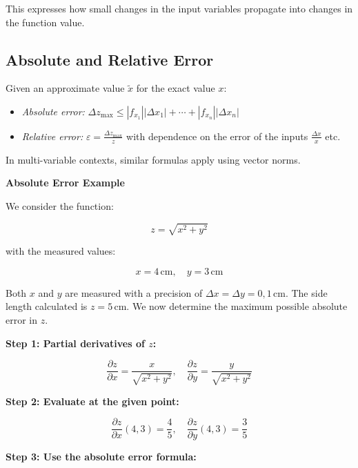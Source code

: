 This expresses how small changes in the input variables propagate into changes in the function value.


\subsection{Absolute and Relative Error}

Given an approximate value \( \tilde{x} \) for the exact value \( x \):

\begin{itemize}

    \item \emph{Absolute error:} \(\Delta z_{\max} \le |f_{x_1}||\Delta x_1| + \cdots + |f_{x_n}||\Delta x_n| \)

    \item \emph{Relative error:} \( \varepsilon = \frac{\Delta z_{\max}}{z}\) with dependence on the error of the inputs \(\frac{\Delta x}{x}\) etc.

\end{itemize}


In multi-variable contexts, similar formulas apply using vector norms.
\vspace{\baselineskip}

\textbf{Absolute Error Example}
\vspace{\baselineskip}

We consider the function:

\[
    z = \sqrt{x^2 + y^2}
\]

with the measured values:

\[
    x = 4 \, \text{cm}, \quad y = 3 \, \text{cm}
\]

Both \( x \) and \( y \) are measured with a precision of \( \Delta x = \Delta y = 0{,}1 \, \text{cm} \). The side length calculated is \( z = 5 \, \text{cm} \). We now determine the maximum possible absolute error in \( z \).

\textbf{Step 1: Partial derivatives of \( z \):}

\[
    \frac{\partial z}{\partial x} = \frac{x}{\sqrt{x^2 + y^2}}, \quad
    \frac{\partial z}{\partial y} = \frac{y}{\sqrt{x^2 + y^2}}
\]

\textbf{Step 2: Evaluate at the given point:}

\[
    \frac{\partial z}{\partial x}(4, 3) = \frac{4}{5}, \quad
    \frac{\partial z}{\partial y}(4, 3) = \frac{3}{5}
\]

\textbf{Step 3: Use the absolute error formula:}

